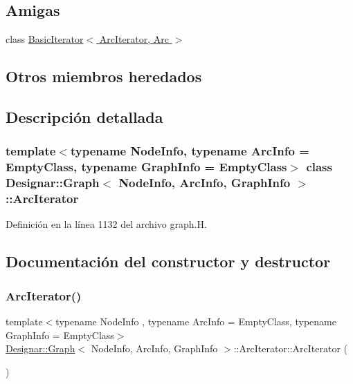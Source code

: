 \subsection*{Amigas}
\begin{DoxyCompactItemize}
\item 
class \hyperlink{class_designar_1_1_graph_1_1_arc_iterator_a530ad7c7218fa9b74a5cce004d0e3a1c}{Basic\+Iterator$<$ Arc\+Iterator, Arc $>$}
\end{DoxyCompactItemize}
\subsection*{Otros miembros heredados}


\subsection{Descripción detallada}
\subsubsection*{template$<$typename Node\+Info, typename Arc\+Info = Empty\+Class, typename Graph\+Info = Empty\+Class$>$\newline
class Designar\+::\+Graph$<$ Node\+Info, Arc\+Info, Graph\+Info $>$\+::\+Arc\+Iterator}



Definición en la línea 1132 del archivo graph.\+H.



\subsection{Documentación del constructor y destructor}
\mbox{\label{class_designar_1_1_graph_1_1_arc_iterator_a642cf08854577ea29ba520ee882c9d54}} 
\subsubsection{\texorpdfstring{Arc\+Iterator()}{ArcIterator()}\hspace{0.1cm}{\footnotesize\ttfamily [1/5]}}
{\footnotesize\ttfamily template$<$typename Node\+Info , typename Arc\+Info  = Empty\+Class, typename Graph\+Info  = Empty\+Class$>$ \\
\hyperlink{class_designar_1_1_graph}{Designar\+::\+Graph}$<$ Node\+Info, Arc\+Info, Graph\+Info $>$\+::Arc\+Iterator\+::\+Arc\+Iterator (\begin{DoxyParamCaption}{ }\end{DoxyParamCaption})\hspace{0.3cm}{\ttfamily [inline]}}




